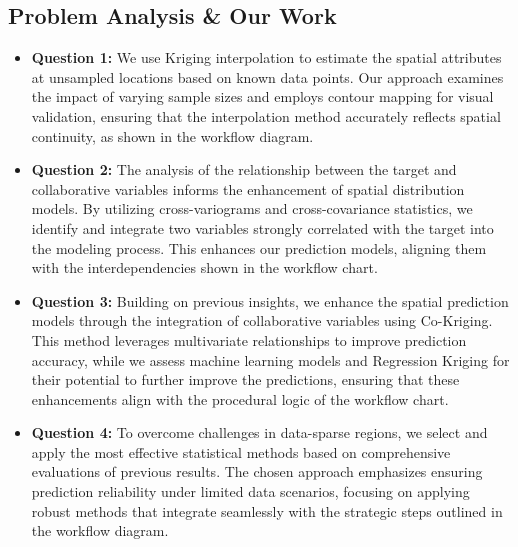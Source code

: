 \documentclass{swmcmthesis}
\begin{document}
\subsection{Problem Analysis \& Our Work}
\begin{itemize}
    \item \textbf{Question 1:}  
    We use Kriging interpolation to estimate the spatial attributes at unsampled locations based on known data points. Our approach examines the impact of varying sample sizes and employs contour mapping for visual validation, ensuring that the interpolation method accurately reflects spatial continuity, as shown in the workflow diagram.
    
    \item \textbf{Question 2:} 
    The analysis of the relationship between the target and collaborative variables informs the enhancement of spatial distribution models. By utilizing cross-variograms and cross-covariance statistics, we identify and integrate two variables strongly correlated with the target into the modeling process. This enhances our prediction models, aligning them with the interdependencies shown in the workflow chart.
    
    \item \textbf{Question 3:}  
    Building on previous insights, we enhance the spatial prediction models through the integration of collaborative variables using Co-Kriging. This method leverages multivariate relationships to improve prediction accuracy, while we assess machine learning models and Regression Kriging for their potential to further improve the predictions, ensuring that these enhancements align with the procedural logic of the workflow chart.
    
    \item \textbf{Question 4:}  
    To overcome challenges in data-sparse regions, we select and apply the most effective statistical methods based on comprehensive evaluations of previous results. The chosen approach emphasizes ensuring prediction reliability under limited data scenarios, focusing on applying robust methods that integrate seamlessly with the strategic steps outlined in the workflow diagram.
\end{itemize}
\end{document}
